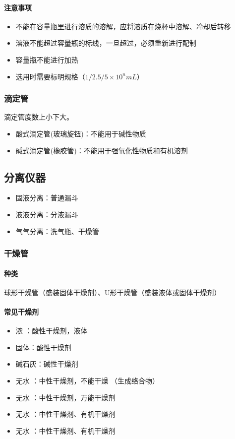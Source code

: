 \documentclass[10pt]{article}
\begin{document}
	\paragraph{注意事项}
	\begin{itemize}
		\item 不能在容量瓶里进行溶质的溶解，应将溶质在烧杯中溶解、冷却后转移
		\item 溶液不能超过容量瓶的标线，一旦超过，必须重新进行配制
		\item 容量瓶不能进行加热
		\item 选用时需要标明规格（$1/2.5/5\times 10^n mL$）
	\end{itemize}
	
	\subsubsection{滴定管}
	滴定管度数上小下大。
	\begin{itemize}
		\item 酸式滴定管(玻璃旋钮)：不能用于碱性物质
		\item 碱式滴定管(橡胶管)：不能用于强氧化性物质和有机溶剂
	\end{itemize}
	
	
	\subsection{分离仪器}
	
	\begin{itemize}
		\item 固液分离：普通漏斗
		\item 液液分离：分液漏斗
		\item 气气分离：洗气瓶、干燥管
	\end{itemize}
	
	\subsubsection{干燥管}
	
	\paragraph{种类}
	球形干燥管（盛装固体干燥剂）、U形干燥管（盛装液体或固体干燥剂）

	\paragraph{常见干燥剂}
	
	\begin{itemize}
		\item 浓 ：酸性干燥剂，液体
		\item {}固体：酸性干燥剂
		\item 碱石灰：碱性干燥剂
		\item 无水 ：中性干燥剂，不能干燥  （生成络合物）
		\item 无水 ：中性干燥剂，万能干燥剂
		\item 无水 ：中性干燥剂、有机干燥剂
		\item 无水 ：中性干燥剂、有机干燥剂
	\end{itemize}
	
\end{document}

